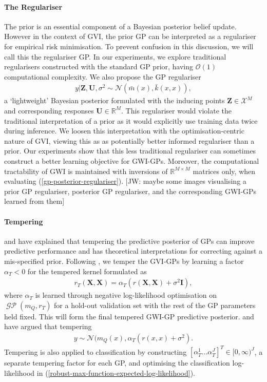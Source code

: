 \documentclass{article}
\newcommand{\jw}[1]{{\color{gray} [JW: #1]}}
\newcommand{\GP}{\operatorname{\mathcal{GP}}}
\numberwithin{equation}{section}
\begin{document}
\paragraph{The Regulariser} The prior is an essential component of a Bayesian posterior belief update.
However in the context of GVI, the prior GP can be interpreted as a regulariser for empirical risk minimisation.
To prevent confusion in this discussion, we will call this the regulariser GP. In our experiments, we explore traditional regularisers constructed with the standard GP prior, having $\mathcal{O}(1)$ computational complexity. We also propose the GP regulariser
\begin{align}
    y \vert \mathbf{Z}, \mathbf{U}, \sigma^2
    \sim \mathcal{N}\left(\bar{m}(x), \bar{k}(x, x)\right),
    \label{gp-posterior-regulariser}
\end{align}
a `lightweight' Bayesian posterior formulated with the inducing points $\mathbf{Z}\in \mathcal{X}^M$ and corresponding responses $\mathbf{U} \in \mathbb{R}^M$.
This regulariser would violate the traditional interpretation of a prior as it would explicitly use training data twice during inference.
We loosen this interpretation with the optimisation-centric nature of GVI, viewing this as as potentially better informed regulariser than a prior.
Our experiments show that this less traditional regulariser can sometimes construct a better learning objective for GWI-GPs.
Moreover, the computational tractability of GWI is maintained with inversions of $\mathbb{R}^{M\times M}$ matrices only, when evaluating (\ref{gp-posterior-regulariser}).
\jw{maybe some images visualising a prior GP regulariser, posterior GP regulariser, and the corresponding GWI-GPs learned from them}

\paragraph{Tempering}\cite{wild2022generalized} and \cite{adlam2020cold} have explained that tempering the predictive posterior of GPs can improve predictive performance and has theoretical interpretations for correcting against a mis-specified prior. Following \cite{wild2022generalized}, we temper the  GVI-GPs by learning a factor $\alpha_T < 0$ for the tempered kernel formulated as
\begin{align}
    r_T(\mathbf{X}, \mathbf{X}) = \alpha_T \left(r(\mathbf{X}, \mathbf{X})+\sigma^2 \mathbf{I}\right),
\end{align}
where $\alpha_T$ is learned through negative log-likelihood optimisation on $\GP(m_Q, r_T)$ for a hold-out validation set with the rest of the GP parameters held fixed. 
This will form the final tempered GWI-GP predictive posterior. 
\cite{wild2022generalized} and \cite{} have argued that tempering 
\begin{align}
    y \sim \mathcal{N}(m_Q(x), \alpha_T \left( r(x, x) + \sigma^2\right).
\end{align}
Tempering is also applied to classification by constructing $\left[\alpha_T^1 \dots \alpha_T^J\right]^T \in [0, \infty)^J$, a separate tempering factor for each GP, and optimising the classification log-likelihood in (\ref{robust-max-function-expected-log-likelihood}).
\end{document}

